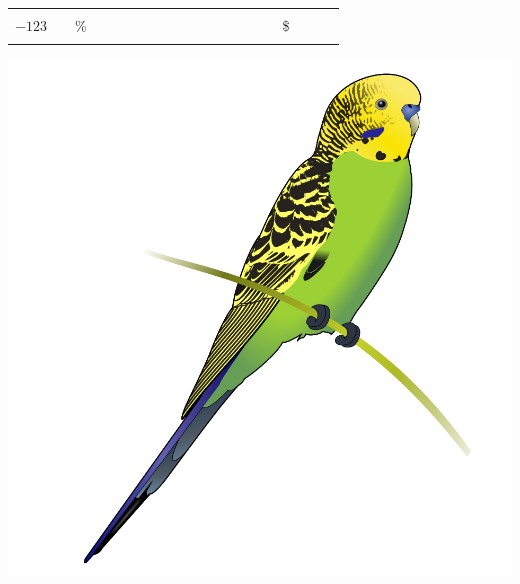 \documentclass[11pt,a4paper]{article}
\begin{document}
{\begin{tabular}{| c ||c|| c ||C{0.33cm}|C{0.33cm}|C{0.33cm}|C{0.33cm} || C{0.33cm}|C{0.33cm}|C{0.33cm}|C{0.33cm} || C{0.33cm}|C{0.33cm}|C{0.33cm}|C{0.33cm} ||c|| c ||C{0.33cm}|C{0.33cm}|C{0.33cm}| }
                   &  &    & & & & &  &  &  &  & & & &  &  &    & & &                                          \\
\hline
                   &  &    & & & & &  &  &  &  & & & &  &  &    & & &                                          \\
$ -123 $             &  & \% & & & & &  &  &  &  & & & &  &  & \$ & & &                                          \\
                   &  &    & & & & &  &  &  &  & & & &  &  &    & & &                                          \\
\hline
\end{tabular}
}


\bigskip

\bigskip




\begin{center}
\includegraphics[scale=0.2]{img/others/Budgerigar_diagram.png}
\end{center}
\end{document}
